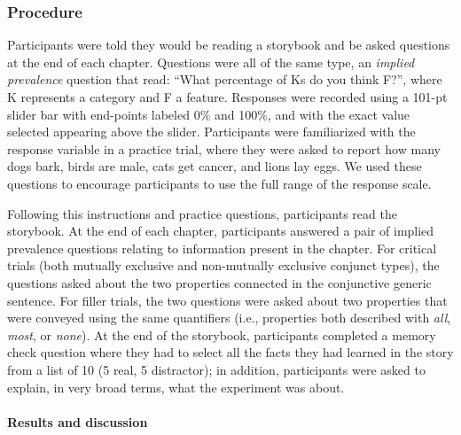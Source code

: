 \documentclass[10pt,letterpaper]{article}
\newcommand{\red}[1]{{\textcolor{Red}{#1}}}
\begin{document}
\subsubsection{Procedure}
Participants were told they would be reading a storybook and be asked questions at the end of each chapter. 
Questions were all of the same type, an \emph{implied prevalence} question \cite{Gelman2002, Cimpian2010} that read: ``What percentage of Ks do you think F?'', where K represents a category and F a feature. 
Responses were recorded using a 101-pt slider bar with end-points labeled 0\% and 100\%, and with the exact value selected appearing above the slider. 
Participants were familiarized with the response variable in a practice trial, where they were asked to report how many dogs bark, birds are male, cats get cancer, and lions lay eggs. 
We used these questions to encourage participants to use the full range of the response scale. 

Following this instructions and practice questions, participants read the storybook.
At the end of each chapter, participants answered a pair of implied prevalence questions relating to information present in the chapter. 
For critical trials (both mutually exclusive and non-mutually exclusive conjunct types), the questions asked about the two properties connected in the conjunctive generic sentence.
For filler trials, the two questions were asked about two properties that were conveyed using the same quantifiers (i.e., properties both described with \emph{all}, \emph{most}, or \emph{none}).
At the end of the storybook, participants completed a memory check question where they had to select all the facts they had learned in the story from a list of 10 (5 real, 5 distractor); in addition, participants were asked to explain, in very broad terms, what the experiment was about.



\paragraph{Results and discussion}
\end{document}
